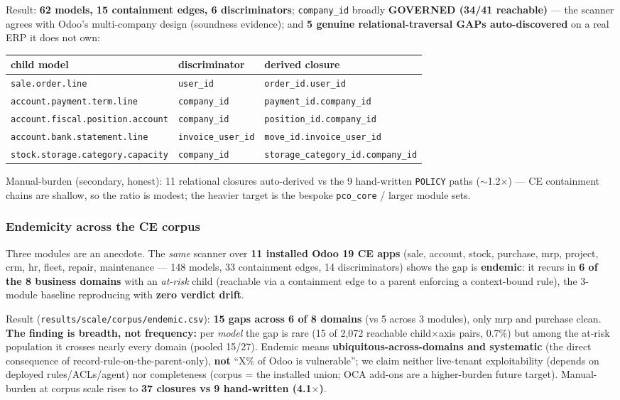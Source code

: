 \documentclass[runningheads]{llncs}
\newcommand{\code}[1]{\texttt{#1}}
\begin{document}
Result: \textbf{62 models, 15 containment edges, 6 discriminators}; \code{company_id} broadly \textbf{GOVERNED
(34/41 reachable)} --- the scanner agrees with Odoo's multi-company design (soundness evidence); and \textbf{5
genuine relational-traversal GAPs auto-discovered} on a real ERP it does not own:

\begin{center}\small
\begin{tabular}{@{}lll@{}}
\toprule
child model & discriminator & derived closure \\
\midrule
\code{sale.order.line}                  & \code{user_id}          & \code{order_id.user_id} \\
\code{account.payment.term.line}        & \code{company_id}       & \code{payment_id.company_id} \\
\code{account.fiscal.position.account}  & \code{company_id}       & \code{position_id.company_id} \\
\code{account.bank.statement.line}      & \code{invoice_user_id}  & \code{move_id.invoice_user_id} \\
\code{stock.storage.category.capacity}  & \code{company_id}       & \code{storage_category_id.company_id} \\
\bottomrule
\end{tabular}
\end{center}

Manual-burden (secondary, honest): 11 relational closures auto-derived vs the 9 hand-written \code{POLICY}
paths ($\sim$1.2$\times$) --- CE containment chains are shallow, so the ratio is modest; the heavier target is
the bespoke \code{pco_core} / larger module sets.

\subsubsection{Endemicity across the CE corpus}
Three modules are an anecdote. The \emph{same} scanner over \textbf{11 installed Odoo 19 CE apps} (sale, account,
stock, purchase, mrp, project, crm, hr, fleet, repair, maintenance --- 148 models, 33 containment edges, 14
discriminators) shows the gap is \textbf{endemic}: it recurs in \textbf{6 of the 8 business domains} with an
\emph{at-risk} child (reachable via a containment edge to a parent enforcing a context-bound rule), the 3-module
baseline reproducing with \textbf{zero verdict drift}.

Result (\code{results/scale/corpus/endemic.csv}): \textbf{15 gaps across 6 of 8 domains} (vs 5 across 3 modules),
only mrp and purchase clean. \textbf{The finding is breadth, not frequency:} per \emph{model} the gap is rare
(15 of 2{,}072 reachable child$\times$axis pairs, 0.7\%) but among the at-risk population it crosses nearly every
domain (pooled 15/27). Endemic means \textbf{ubiquitous-across-domains and systematic} (the direct consequence of
record-rule-on-the-parent-only), \textbf{not} ``X\% of Odoo is vulnerable''; we claim neither live-tenant
exploitability (depends on deployed rules/ACLs/agent) nor completeness (corpus = the installed union; OCA add-ons
are a higher-burden future target). Manual-burden at corpus scale rises to \textbf{37 closures vs 9 hand-written
(4.1$\times$)}.
\end{document}

